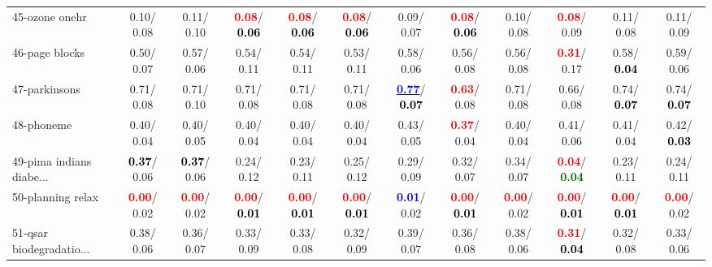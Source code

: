 \begin{table}[h]
\begin{center}
{\begin{tabular}{lc|c|c|c|c|c|c|c|c|c|c}
45-ozone onehr &   0.10/  0.08 &   0.11/  0.10 & \textcolor{red}{\textbf{  0.08}}/\textcolor{black}{\textbf{  0.06}} & \textcolor{red}{\textbf{  0.08}}/\textcolor{black}{\textbf{  0.06}} & \textcolor{red}{\textbf{  0.08}}/\textcolor{black}{\textbf{  0.06}} &   0.09/  0.07 & \textcolor{red}{\textbf{  0.08}}/\textcolor{black}{\textbf{  0.06}} &   0.10/  0.08 & \textcolor{red}{\textbf{  0.08}}/  0.09 &   0.11/  0.08 &   0.11/  0.09 \\
46-page blocks &   0.50/  0.07 &   0.57/  0.06 &   0.54/  0.11 &   0.54/  0.11 &   0.53/  0.11 &   0.58/  0.06 &   0.56/  0.08 &   0.56/  0.08 & \textcolor{red}{\textbf{  0.31}}/  0.17 &   0.58/\textcolor{black}{\textbf{  0.04}} &   0.59/  0.06 \\ \hline
47-parkinsons &   0.71/  0.08 &   0.71/  0.10 &   0.71/  0.08 &   0.71/  0.08 &   0.71/  0.08 & \underline{\textcolor{blue}{\textbf{  0.77}}}/\textcolor{black}{\textbf{  0.07}} & \textcolor{red}{\textbf{  0.63}}/  0.08 &   0.71/  0.08 &   0.66/  0.08 &   0.74/\textcolor{black}{\textbf{  0.07}} &   0.74/\textcolor{black}{\textbf{  0.07}} \\
48-phoneme &   0.40/  0.04 &   0.40/  0.05 &   0.40/  0.04 &   0.40/  0.04 &   0.40/  0.04 &   0.43/  0.05 & \textcolor{red}{\textbf{  0.37}}/  0.04 &   0.40/  0.04 &   0.41/  0.06 &   0.41/  0.04 &   0.42/\textcolor{black}{\textbf{  0.03}} \\
49-pima indians diabe... & \textcolor{black}{\textbf{  0.37}}/  0.06 & \textcolor{black}{\textbf{  0.37}}/  0.06 &   0.24/  0.12 &   0.23/  0.11 &   0.25/  0.12 &   0.29/  0.09 &   0.32/  0.07 &   0.34/  0.07 & \textcolor{red}{\textbf{  0.04}}/\textcolor{darkgreen}{\textbf{  0.04}} &   0.23/  0.11 &   0.24/  0.11 \\
50-planning relax & \textcolor{red}{\textbf{  0.00}}/  0.02 & \textcolor{red}{\textbf{  0.00}}/  0.02 & \textcolor{red}{\textbf{  0.00}}/\textcolor{black}{\textbf{  0.01}} & \textcolor{red}{\textbf{  0.00}}/\textcolor{black}{\textbf{  0.01}} & \textcolor{red}{\textbf{  0.00}}/\textcolor{black}{\textbf{  0.01}} & \textcolor{blue}{\textbf{  0.01}}/  0.02 & \textcolor{red}{\textbf{  0.00}}/\textcolor{black}{\textbf{  0.01}} & \textcolor{red}{\textbf{  0.00}}/  0.02 & \textcolor{red}{\textbf{  0.00}}/\textcolor{black}{\textbf{  0.01}} & \textcolor{red}{\textbf{  0.00}}/\textcolor{black}{\textbf{  0.01}} & \textcolor{red}{\textbf{  0.00}}/  0.02 \\
51-qsar biodegradatio... &   0.38/  0.06 &   0.36/  0.07 &   0.33/  0.09 &   0.33/  0.08 &   0.32/  0.09 &   0.39/  0.07 &   0.36/  0.08 &   0.38/  0.06 & \textcolor{red}{\textbf{  0.31}}/\textcolor{black}{\textbf{  0.04}} &   0.32/  0.08 &   0.33/  0.06 \\

\end{tabular}}
\end{center}
\end{table}
